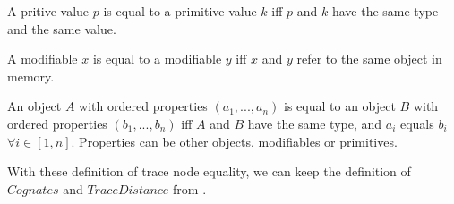 \begin{definition}
A pritive value $p$ is equal to a primitive value $k$ iff $p$ and $k$ have the same type and the same value. 

A modifiable $x$ is equal to a modifiable $y$ iff $x$ and $y$ refer to the same object in memory.

An object $A$ with ordered properties $(a_1, ..., a_n)$ is equal to an object $B$ with ordered properties  $(b_1, ..., b_n)$ iff $A$ and $B$ have the same type, and $a_i$ equals $b_i$ $\forall i \in[1, n]$. Properties can be other objects, modifiables or primitives. 
\end{definition}

With these definition of trace node equality, we can keep the definition of $Cognates$ and $Trace Distance$ from \cite{Acar2005thesis}.  
